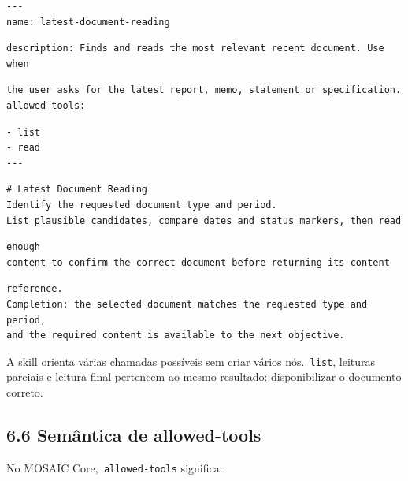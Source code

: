 \documentclass[12pt,a4paper]{article}
\begin{document}
\begin{Verbatim}[breaklines=true,breakanywhere=true,fontsize=\small]
---
name: latest-document-reading
\end{Verbatim}


\begin{Verbatim}[breaklines=true,breakanywhere=true,fontsize=\small]
description: Finds and reads the most relevant recent document. Use when
\end{Verbatim}

\begin{Verbatim}[breaklines=true,breakanywhere=true,fontsize=\small]
the user asks for the latest report, memo, statement or specification.
allowed-tools:
\end{Verbatim}

\begin{Verbatim}[breaklines=true,breakanywhere=true,fontsize=\small]
- list
- read
---
\end{Verbatim}

\begin{Verbatim}[breaklines=true,breakanywhere=true,fontsize=\small]
# Latest Document Reading
Identify the requested document type and period.
List plausible candidates, compare dates and status markers, then read
\end{Verbatim}

\begin{Verbatim}[breaklines=true,breakanywhere=true,fontsize=\small]
enough
content to confirm the correct document before returning its content
\end{Verbatim}

\begin{Verbatim}[breaklines=true,breakanywhere=true,fontsize=\small]
reference.
Completion: the selected document matches the requested type and period,
and the required content is available to the next objective.
\end{Verbatim}

A skill orienta várias chamadas possíveis sem criar vários nós.\texttt{ list}, leituras parciais e leitura final pertencem ao mesmo resultado: disponibilizar o documento correto.


\subsection*{6.6 Semântica de allowed-tools}

No MOSAIC Core,\texttt{ allowed-tools} significa:
\end{document}
